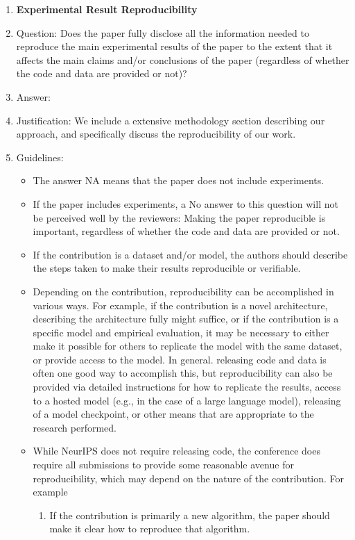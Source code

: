 \documentclass{article}
\begin{document}
\begin{enumerate}
    \item {\bf Experimental Result Reproducibility}
    \item[] Question: Does the paper fully disclose all the information needed to reproduce the main experimental results of the paper to the extent that it affects the main claims and/or conclusions of the paper (regardless of whether the code and data are provided or not)?
    \item[] Answer: \answerYes{} %
    \item[] Justification: We include a extensive methodology section describing our approach, and specifically discuss the reproducibility of our work.
    \item[] Guidelines:
    \begin{itemize}
        \item The answer NA means that the paper does not include experiments.
        \item If the paper includes experiments, a No answer to this question will not be perceived well by the reviewers: Making the paper reproducible is important, regardless of whether the code and data are provided or not.
        \item If the contribution is a dataset and/or model, the authors should describe the steps taken to make their results reproducible or verifiable. 
        \item Depending on the contribution, reproducibility can be accomplished in various ways. For example, if the contribution is a novel architecture, describing the architecture fully might suffice, or if the contribution is a specific model and empirical evaluation, it may be necessary to either make it possible for others to replicate the model with the same dataset, or provide access to the model. In general. releasing code and data is often one good way to accomplish this, but reproducibility can also be provided via detailed instructions for how to replicate the results, access to a hosted model (e.g., in the case of a large language model), releasing of a model checkpoint, or other means that are appropriate to the research performed.
        \item While NeurIPS does not require releasing code, the conference does require all submissions to provide some reasonable avenue for reproducibility, which may depend on the nature of the contribution. For example
        \begin{enumerate}
            \item If the contribution is primarily a new algorithm, the paper should make it clear how to reproduce that algorithm.

\end{enumerate}
\end{itemize}
\end{enumerate}
\end{document}
